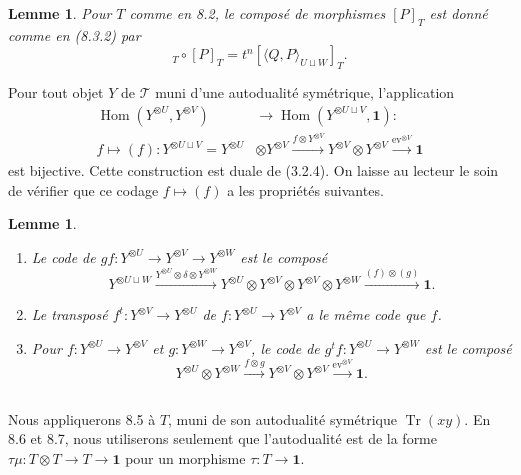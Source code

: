 \documentclass[11pt,a4paper]{article}
\theoremstyle{plain}
\newtheorem{lemma}[theorem]{Lemme}
\theoremstyle{definition}
\DeclareMathOperator{\Hom}{Hom}
\DeclareMathOperator{\Tr}{Tr}
\newcommand{\ev}{\mathrm{ev}}
\begin{document}
\begin{lemma}
Pour $T$ comme en 8.2, le compos\'e de morphismes $[P]_T$ est donn\'e comme en (8.3.2) par
\begin{equation}
[Q]_T \circ [P]_T = t^n [\langle Q, P \rangle_{U \sqcup W}]_T. \tag{8.4.1}
\end{equation}
\end{lemma}

Pour tout objet $Y$ de $\mathcal{T}$ muni d'une autodualit\'e sym\'etrique, l'application
\begin{align*}
\Hom(Y^{\otimes U}, Y^{\otimes V}) &\to \Hom(Y^{\otimes U \sqcup V}, \mathbf{1}) : \\
f \longmapsto (f) : Y^{\otimes U \sqcup V} = Y^{\otimes U} &\otimes Y^{\otimes V} \xrightarrow{f \otimes Y^{\otimes V}} Y^{\otimes V} \otimes Y^{\otimes V} \xrightarrow{\ev^{\otimes V}} \mathbf{1}
\end{align*}
est bijective. Cette construction est duale de (3.2.4). On laisse au lecteur le soin de v\'erifier que ce codage $f \mapsto (f)$ a les propri\'et\'es suivantes.

\begin{lemma}
\begin{enumerate}[label=(\roman*)]
\item Le code de $gf : Y^{\otimes U} \to Y^{\otimes V} \to Y^{\otimes W}$ est le compos\'e
\[
Y^{\otimes U \sqcup W} \xrightarrow{Y^{\otimes U} \otimes \delta \otimes Y^{\otimes W}} Y^{\otimes U} \otimes Y^{\otimes V} \otimes Y^{\otimes V} \otimes Y^{\otimes W} \xrightarrow{(f) \otimes (g)} \mathbf{1}.
\]
\item Le transpos\'e $f^t : Y^{\otimes V} \to Y^{\otimes U}$ de $f : Y^{\otimes U} \to Y^{\otimes V}$ a le m\^eme code que $f$.
\item Pour $f : Y^{\otimes U} \to Y^{\otimes V}$ et $g : Y^{\otimes W} \to Y^{\otimes V}$, le code de $g^t f : Y^{\otimes U} \to Y^{\otimes W}$ est le compos\'e
\[
Y^{\otimes U} \otimes Y^{\otimes W} \xrightarrow{f \otimes g} Y^{\otimes V} \otimes Y^{\otimes V} \xrightarrow{\ev^{\otimes V}} \mathbf{1}.
\]
\end{enumerate}
\end{lemma}

\subsection{}
Nous appliquerons 8.5 \`a $T$, muni de son autodualit\'e sym\'etrique $\Tr(xy)$. En 8.6 et 8.7, nous utiliserons seulement que l'autodualit\'e est de la forme $\tau \mu : T \otimes T \to T \to \mathbf{1}$ pour un morphisme $\tau : T \to \mathbf{1}$.
\end{document}
